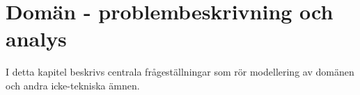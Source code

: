 \chapter{Domän - problembeskrivning och analys}
I detta kapitel beskrivs centrala frågeställningar som rör  modellering av domänen och andra icke-tekniska ämnen.















